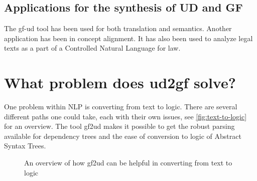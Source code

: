 


\subsection{Applications for the synthesis of UD and GF}

The gf-ud tool has been used for both translation and semantics\cite{ranta-al-2020}. %
Another application has been in concept alignment\cite{masciolini-ranta-2021}.
It has also been used to analyze legal texts as a part of a Controlled Natural Language for law\cite{listenmaa-etal-2021-towards}.

\section{What problem does ud2gf solve?}
% 
% 

One problem within \ac{NLP} is converting from text to logic. There are several different paths one could take, each with their own issues, see \autoref{fig:text-to-logic} for an overview. The tool gf2ud makes it possible to get the robust parsing available for dependency trees and the ease of conversion to logic of Abstract Syntax Trees.

\begin{figure}[H]
    \centering
    \caption{An overview of how gf2ud can be helpful in converting from text to logic}
    \label{fig:text-to-logic}
\end{figure}

